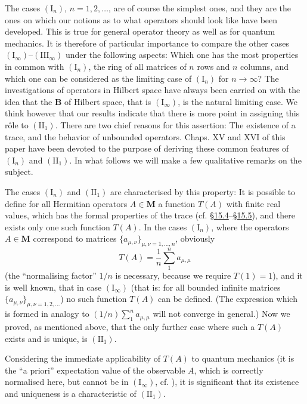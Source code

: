 \documentclass[12pt,b5paper,twoside]{article}
\newcommand{\M}{\mathbf M}
\newcommand{\B}{\mathbf B}
\newcommand{\secref}[1]{\hyperref[sec:#1]{\S#1}}
\begin{document}
The cases $(\mathrm I_n)$, $n=1,2,\ldots$, are of course the simplest ones, and
they are the ones on which our notions as to what operators should look like
have been developed. This is true for general operator theory as well as for
quantum mechanics. It is therefore of particular importance to compare the
other cases $(\mathrm I_\infty)$--$(\mathrm{III}_\infty)$ under the following
aspects: Which one has the most properties in common with $(\mathrm I_n)$, the
ring of all matrices of $n$ rows and $n$ columns, and which one can be
considered as the limiting case of $(\mathrm I_n)$ for $n\to\infty$? The
investigations of operators in Hilbert space have always been carried on with
the idea that the $\B$ of Hilbert space, that is $(\mathrm I_\infty)$, is the
natural limiting case. We think however that our results indicate that there is
more point in assigning this r\^ole to $(\mathrm{II}_1)$. There are two chief
reasons for this assertion: The existence of a trace, and the behavior of
unbounded operators. Chaps. XV and XVI of this paper have been devoted to
the purpose of deriving these common features of $(\mathrm I_n)$ and
$(\mathrm{II}_1)$. In what follows we will make a few qualitative remarks on
the subject.

The cases $(\mathrm I_n)$ and $(\mathrm{II}_1)$ are characterised by this
property: It is possible to define for all Hermitian operators $A\in\M$ a
function $T(A)$ with finite real values, which has the formal properties of the
trace (cf. \secref{15.4}--\secref{15.5}), and there exists only one such function
$T(A)$. In the cases $(\mathrm I_n)$, where the operators $A\in\M$ correspond
to matrices $\{a_{\mu,\nu}\}_{\mu,\nu=1,\ldots,n}$, obviously
\[
 T(A)=\frac1n\sum_{1}^{n} a_{\mu,\mu}
\]
(the ``normalising factor'' $1/n$ is necessary, because we require $T(1)=1$),
and it is well known, that in case $(\mathrm I_\infty)$ (that is: for all bounded
infinite matrices $\{a_{\mu,\nu}\}_{\mu,\nu=1,2,\ldots}$) no such function
$T(A)$ can be defined. (The expression which is formed in analogy to
$(1/n)\sum_{1}^{n} a_{\mu,\mu}$ will not converge in general.) Now we
proved, as mentioned above, that the only further case where such a $T(A)$
exists and is unique, is $(\mathrm{II}_1)$.

Considering the immediate applicability of $T(A)$ to quantum mechanics (it
is the ``a priori'' expectation value of the observable $A$, which is correctly
normalised here, but cannot be in $(\mathrm I_\infty)$,
cf. \cite[pp.~165, 169]{ref20}), it is significant that its existence and
uniqueness is a characteristic of $(\mathrm{II}_1)$.
\end{document}
